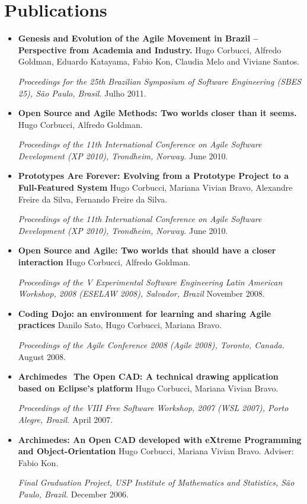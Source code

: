 \documentclass[letter,10pt]{article}
\begin{document}
\section{Publications}

\begin{itemize}
\item \textbf{Genesis and Evolution of the Agile Movement in Brazil
        – Perspective from Academia and Industry.} Hugo Corbucci,
        Alfredo Goldman, Eduardo Katayama, Fabio Kon, Claudia Melo
        and Viviane Santos.

  \textit{Proceedings for the 25th Brazilian Symposium of Software
     Engineering (SBES 25), São Paulo, Brasil.} Julho 2011.

\item \textbf{Open Source and Agile Methods: Two worlds closer than it
    seems.} Hugo Corbucci, Alfredo Goldman.

  \textit{Proceedings of the 11th International Conference on Agile
    Software Development (XP 2010), Trondheim, Norway.} June 2010.

\item \textbf{Prototypes Are Forever: Evolving from a Prototype
    Project to a Full-Featured System} Hugo Corbucci, Mariana Vivian
  Bravo, Alexandre Freire da Silva, Fernando Freire da Silva.

  \textit{Proceedings of the 11th International Conference on Agile
    Software Development (XP 2010), Trondheim, Norway.} June 2010.

\item \textbf{Open Source and Agile: Two worlds that should have a
    closer interaction} Hugo Corbucci, Alfredo Goldman.

  \textit{Proceedings of the V Experimental Software Engineering Latin
    American Workshop, 2008 (ESELAW 2008), Salvador, Brazil} November
  2008.

\item \textbf{Coding Dojo: an environment for learning and sharing
    Agile practices} Danilo Sato, Hugo Corbucci, Mariana Bravo.

  \textit{Proceedings of the Agile Conference 2008 (Agile 2008),
    Toronto, Canada.} August 2008.

\item \textbf{Archimedes ­ The Open CAD: A technical drawing
    application based on Eclipse's platform} Hugo Corbucci, Mariana
  Vivian Bravo.

  \textit{Proceedings of the VIII Free Software Workshop, 2007 (WSL
    2007), Porto Alegre, Brazil.} April 2007.

\item \textbf{Archimedes: An Open CAD developed with eXtreme
    Programming and Object-Orientation} Hugo Corbucci, Mariana Vivian
  Bravo. Adviser: Fabio Kon.

  \textit{Final Graduation Project, USP Institute of Mathematics and
    Statistics, São Paulo, Brazil.} December 2006.
\end{itemize}
\end{document}
